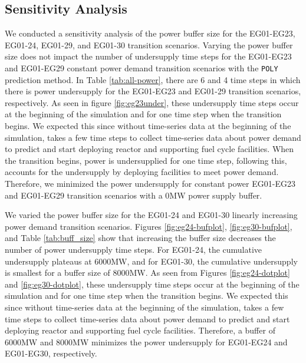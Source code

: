 \subsection{Sensitivity Analysis}
We conducted a sensitivity analysis of the power buffer size for the
EG01-EG23, EG01-24, EG01-29, and EG01-30 transition scenarios. 
Varying the power buffer size does not impact the number of 
undersupply time steps for the EG01-EG23 and EG01-EG29 constant 
power demand transition scenarios with the \texttt{POLY} prediction method.
In Table \ref{tab:all-power}, there are 6 and 4 time steps
in which there is power undersupply for the EG01-EG23 and EG01-29 
transition scenarios, respectively. 
As seen in figure \ref{fig:eg23under}, these undersupply time 
steps occur at the beginning of the simulation and for one 
time step when the transition begins. 
We expected this since without time-series data 
at the beginning of the simulation, \deploy takes a few 
time steps to collect time-series data about power demand 
to predict and start deploying reactor and supporting 
fuel cycle facilities. 
When the transition begins, power is undersupplied for one 
time step, following this, \deploy accounts for the 
undersupply by deploying facilities to meet power demand.
Therefore, we minimized the power undersupply for constant 
power EG01-EG23 and EG01-EG29 transition scenarios with 
a 0MW power supply buffer. 

We varied the power buffer size for the EG01-24 and EG01-30 
linearly increasing power demand transition scenarios. 
Figures \ref{fig:eg24-bufplot}, \ref{fig:eg30-bufplot}, 
and Table \ref{tab:buff_size} 
show that increasing the buffer size decreases the number of 
power undersupply time steps. 
For EG01-24, the cumulative undersupply plateaus at 6000MW, 
and for EG01-30, the cumulative undersupply is smallest 
for a buffer size of 8000MW.
As seen from Figures \ref{fig:eg24-dotplot} and 
\ref{fig:eg30-dotplot}, these undersupply time 
steps occur at the beginning of the simulation and for one 
time step when the transition begins. 
We expected this since without time-series data 
at the beginning of the simulation, \deploy takes a few 
time steps to collect time-series data about power demand 
to predict and start deploying reactor and supporting 
fuel cycle facilities. 
Therefore, a buffer of 6000MW and 8000MW minimizes 
the power undersupply for EG01-EG24 and EG01-EG30, respectively.

